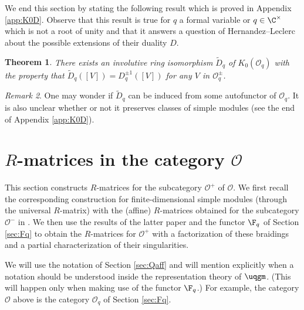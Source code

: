 \documentclass[11pt]{amsart}
\newtheorem{theorem}{Theorem}[section]
\theoremstyle{definition}
\theoremstyle{remark}
\newtheorem{rem}[theorem]{Remark}
\numberwithin{equation}{section}
\begin{document}
We end this section by stating the following result which is proved in Appendix \ref{app:K0D}. Observe that this result is true for $q$ a formal variable or $q\in \C^{\times}$ which is not a root of unity and that it answers a question of Hernandez--Leclerc about the possible extensions of their duality $D$.
\begin{theorem}\label{thm:DExt}
There exists an involutive ring isomorphism $\tilde{D}_q$ of $K_0(\mathcal{O}_q)$ with the property that $\tilde{D}_q([V]) = D_q^{\pm 1}([V])$ for any $V$ in $\mathcal{O}^{\pm}_q$.
\end{theorem}
\begin{rem} One may wonder if $\tilde{D}_q$ can be induced from some autofunctor of $\mathcal{O}_q$. It is also unclear whether or not it preserves classes of simple modules (see the end of Appendix \ref{app:K0D}). 
\end{rem}
\section{$R$-matrices in the category $\mathcal{O}$}\label{sec:RMat}
This section constructs $R$-matrices for the subcategory $\mathcal{O}^{+}$ of $\mathcal{O}$. We first recall the corresponding construction for finite-dimensional simple modules (through the universal $R$-matrix) with the (affine) $R$-matrices obtained for the subcategory $\mathcal{O}^-$ in \cite{her}. We then use the results of the latter paper and the functor $\F_q$ of Section \ref{sec:Fq} to obtain the $R$-matrices for $\mathcal{O}^+$ with a factorization of these braidings and a partial characterization of their singularities.
\par 
We will use the notation of Section \ref{sec:Qaff} and will mention explicitly when a notation should be understood inside the representation theory of $\uqgm$. (This will happen only when making use of the functor $\F_q$.) For example, the category $\mathcal{O}$ above is the category $\mathcal{O}_q$ of Section \ref{sec:Fq}.
\end{document}
